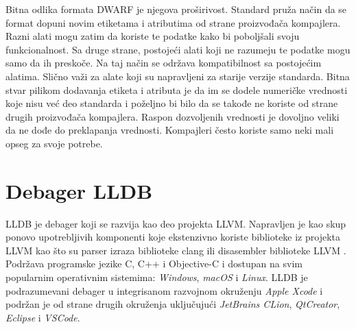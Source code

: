 \documentclass[12pt,oneside]{memoir}
\begin{document}
Bitna odlika formata DWARF je njegova proširivost.
Standard pruža način da se format dopuni novim etiketama i atributima od strane proizvođača kompajlera.
Razni alati mogu zatim da koriste te podatke kako bi poboljšali svoju funkcionalnost.
Sa druge strane, postojeći alati koji ne razumeju te podatke mogu samo da ih preskoče.
Na taj način se održava kompatibilnost sa postojećim alatima.
Slično važi za alate koji su napravljeni za starije verzije standarda.
Bitna stvar pilikom dodavanja etiketa i atributa je da im se dodele numeričke vrednosti koje nisu već deo standarda i poželjno bi bilo da se takođe ne koriste od strane drugih proizvođača kompajlera.
Raspon dozvoljenih vrednosti je dovoljno veliki da ne dođe do preklapanja vrednosti.
Kompajleri često koriste samo neki mali opseg za svoje potrebe.

\section{Debager LLDB}
\label{sec:lldb}



LLDB je debager koji se razvija kao deo projekta LLVM.
Napravljen je kao skup ponovo upotrebljivih komponenti koje ekstenzivno koriste biblioteke iz projekta LLVM kao što su parser izraza biblioteke clang ili disasembler biblioteke LLVM \cite{lldb}.
Podržava programske jezike C, C++ i Objective-C i dostupan na svim popularnim operativnim sistemima: \textit{Windows}, \textit{macOS} i \textit{Linux}.
LLDB je podrazumevani debager u integrisanom razvojnom okruženju \textit{Apple Xcode} i podržan je od strane drugih okruženja uključujući \textit{JetBrains CLion}, \textit{QtCreator}, \textit{Eclipse} i \textit{VSCode}.
\end{document}
